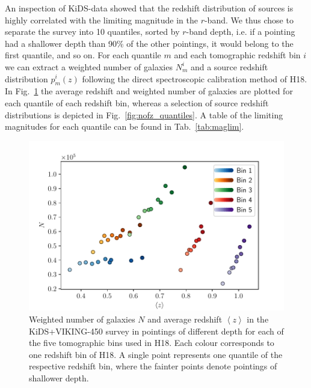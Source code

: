 \documentclass{aa}
\def\la{\left<}
\def\ra{\right>}
\begin{document}
An inspection of KiDS-data showed that the redshift distribution of sources is highly correlated with the limiting magnitude in the $r$-band. We thus chose to separate the survey into 10 quantiles, sorted by $r$-band depth, i.e. if a pointing had a shallower depth than 90\% of the other pointings, it would belong to the first quantile, and so on. For each quantile $m$ and each tomographic redshift bin $i$ we can extract a weighted number of galaxies $N^i_m$ and a source redshift distribution $p^i_m(z)$ following the direct spectroscopic calibration method of H18. In Fig.~\ref{fig:nz_of_meanz} the average redshift and weighted number of galaxies are plotted for each quantile of each redshift bin, whereas a selection of source redshift distributions is depicted in Fig.~\ref{fig:nofz_quantiles}. A table of the limiting magnitudes for each quantile can be found in Tab.~\ref{tab:maglim}.
%
\begin{figure}
\centering
\includegraphics[width=\linewidth]{images/cov_nz_meanz.pdf}
\caption{Weighted number of galaxies $N$ and average redshift $\la z\ra$ in the KiDS+VIKING-450 survey \citep[KV450,][]{Wright:2018} in pointings of different depth for each of the five tomographic bins used in H18. Each colour corresponds to one redshift bin of H18. A single point represents one quantile of the respective redshift bin, where the fainter points denote pointings of shallower depth.}
\label{fig:nz_of_meanz}
\end{figure}
\end{document}
